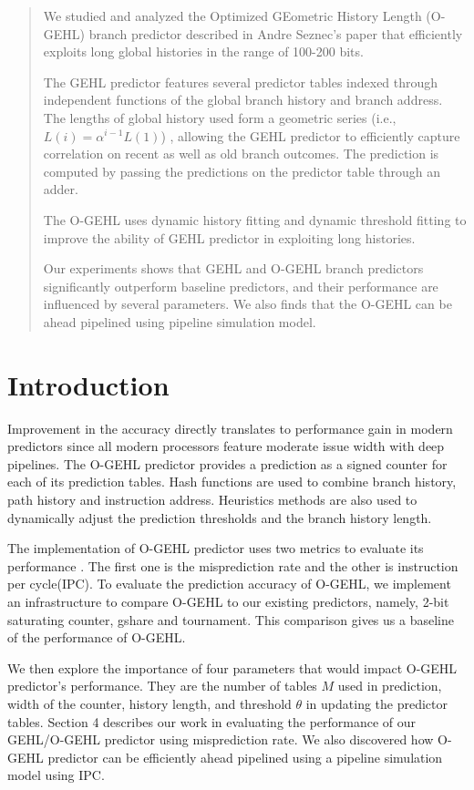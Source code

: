 \begin{abstract}

We studied and analyzed the Optimized GEometric History Length (O-GEHL) branch predictor described in Andre Seznec's paper \cite{seznec2005analysis} that efficiently exploits long global histories in the range of 100-200 bits.

The GEHL predictor features several predictor tables indexed through independent functions of the global branch history and branch address. The lengths of global history used form a geometric series (i.e., $L(i)=\alpha^{i-1}L(1)$) , allowing the GEHL predictor to efficiently capture correlation on recent as well as  old branch outcomes. The prediction is computed by passing the predictions on the predictor table through an adder.

The O-GEHL uses dynamic history fitting and dynamic threshold fitting to improve the ability of GEHL predictor in exploiting long histories.

Our experiments shows that GEHL and O-GEHL branch predictors significantly outperform baseline predictors, and their performance are influenced by several parameters. We also finds that the O-GEHL can be ahead pipelined using pipeline simulation model.
\end{abstract}

\section{Introduction}
Improvement in the accuracy directly translates to performance gain in modern predictors since all modern processors feature moderate issue width with deep pipelines. The O-GEHL predictor provides a prediction as a signed counter for each of its prediction tables. Hash functions are used to combine branch history, path history and instruction address. Heuristics methods are also used to dynamically adjust the prediction thresholds and the branch history length.

The implementation of O-GEHL predictor uses two metrics to evaluate its performance . The first one is the misprediction rate and the other is instruction per cycle(IPC). To evaluate the prediction accuracy of O-GEHL, we implement an infrastructure to compare O-GEHL to our existing predictors, namely, 2-bit saturating counter, gshare and tournament. This comparison gives us a baseline of the performance of O-GEHL.

We then explore the importance of four parameters that would impact O-GEHL predictor's performance. They are the number of tables $M$ used in prediction, width of the counter, history length, and threshold $\theta$ in updating the predictor tables. Section 4 describes our work in evaluating the performance of our GEHL/O-GEHL predictor using misprediction rate. We also discovered how O-GEHL predictor can be efficiently ahead pipelined using a pipeline simulation model using IPC.

